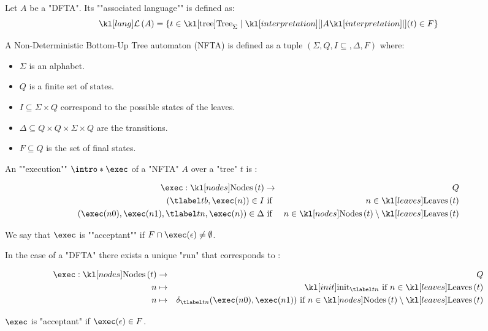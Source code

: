 \documentclass{article}
\begin{document}
\begin{definition}
	Let $A$ be a "DFTA". Its ""associated language"" is defined as:
	\[\lang A = \setdef {t \in \tree_{\Sigma}} {\interpret A (t) \in F}\]
\end{definition}

\begin{definition}
	A Non-Deterministic Bottom-Up Tree automaton (NFTA) is defined as a tuple
	$(\Sigma, Q, I \subseteq, \Delta , F )$ where:
	\begin{itemize}
		\item $\Sigma$ is an alphabet.
		\item $Q$ is a finite set of states.
		\item $I \subseteq \Sigma \times Q$ correspond to the possible states of the leaves.
		\item $\Delta \subseteq Q \times Q \times \Sigma \times Q$ are the transitions.
		\item $F \subseteq Q$ is the set of final states.
	\end{itemize}
\end{definition}


\begin{definition}
	An ""execution"" $\intro* \exec$ of a "NFTA" $A$ over a "tree" $t$ is :

	\begin{eqnarray*}
		\exec : \nodes t &\to& Q \\
		(\tlabel t b,  \exec (n) ) \in I &\text{ if }& n \in \leaves t \\
		(\exec (n0), \exec (n1), \tlabel t n, \exec (n)) \in \Delta &\text{ if }& n \in \nodes t \setminus \leaves t
	\end{eqnarray*}

	We say that $\exec$ is ""acceptant"" if $F \cap \exec (\epsilon) \neq \emptyset$.
\end{definition}

\begin{remark}
	In the case of a "DFTA" there exists a unique "run" that corresponds to :

	\begin{eqnarray*}
		\exec : \nodes t &\to & Q \\
		n  &\mapsto& \init_{\tlabel t n} \text{ if } n \in \leaves t \\
		n  &\mapsto& \delta_{\tlabel t n}(\exec (n0), \exec (n1)) \text{ if } n \in \nodes t \setminus \leaves t
	\end{eqnarray*}

	$\exec$ is "acceptant" if $\exec (\epsilon) \in F$.
\end{remark}
\end{document}
